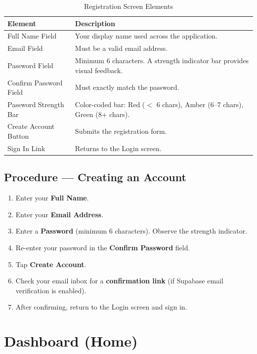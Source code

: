 \documentclass[10pt, a4paper, oneside]{report}
\begin{document}
\begin{table}[H]
\centering
\caption{Registration Screen Elements}
\label{tab:reg-elements}
\begin{tabularx}{\textwidth}{l X}
  \toprule
  \textbf{Element} & \textbf{Description} \\
  \midrule
  Full Name Field         & Your display name used across the application. \\
  Email Field             & Must be a valid email address. \\
  Password Field          & Minimum 6 characters. A strength indicator bar provides visual feedback. \\
  Confirm Password Field  & Must exactly match the password. \\
  Password Strength Bar   & Color-coded bar: Red ($<$ 6 chars), Amber (6--7 chars), Green (8+ chars). \\
  Create Account Button   & Submits the registration form. \\
  Sign In Link            & Returns to the Login screen. \\
  \bottomrule
\end{tabularx}
\end{table}

\subsection*{Procedure --- Creating an Account}
\begin{enumerate}[leftmargin=*, nosep]
  \item Enter your \textbf{Full Name}.
  \item Enter your \textbf{Email Address}.
  \item Enter a \textbf{Password} (minimum 6 characters). Observe the strength indicator.
  \item Re-enter your password in the \textbf{Confirm Password} field.
  \item Tap \textbf{Create Account}.
  \item Check your email inbox for a \textbf{confirmation link} (if Supabase email verification is enabled).
  \item After confirming, return to the Login screen and sign in.
\end{enumerate}

\section{Dashboard (Home)}
\label{sec:dashboard}
\end{document}
